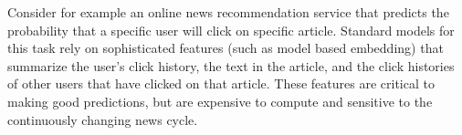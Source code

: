 

Consider for example an online news recommendation service that predicts the probability that a specific user will click on specific article.
Standard models for this task \cite{koren2009matrix,DLRM19}
rely on sophisticated features (such as model based embedding) that summarize the 
user's click history, the text in the article, and the click histories of other users that have clicked on that article.
These features are critical to making good predictions, but are expensive to compute and sensitive to the continuously changing news cycle. 








